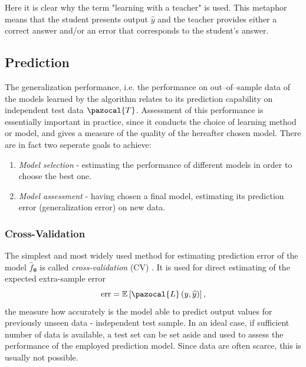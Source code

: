Here it is clear why the term "learning with a teacher" is used. This metaphor means that the student presents output $\widehat{y}$  and the teacher provides either a correct answer and/or an error that corresponds to the student's answer. 

\subsection{Prediction}
The generalization performance, i.e. the performance on out--of--sample data of the models learned by the algorithm relates to its prediction capability on independent test data $\pazocal{T}$. Assessment of this performance is essentially important in practice, since it conducts the choice of learning
method or model, and gives a measure of the quality of the hereafter
chosen model. There are in fact two seperate goals to achieve:
\begin{enumerate}
    \item \emph{Model selection} - estimating the performance of different models in order to choose the best one.
    \item \emph{Model assessment} - having chosen a final model, estimating its prediction error (generalization error) on new data.
\end{enumerate}
\subsubsection{Cross-Validation}
The simplest and most widely used method for estimating prediction error of the model $\hat{f}_{\boldsymbol{\theta}}$ is called \emph{cross-validation} (CV) \cite{statistics}. It is used for direct estimating of the expected extra-sample error
\begin{equation}
\mathrm{err} = \E\left[\pazocal{L}\left(y, \widehat{y}\right)\right],
\end{equation}
the measure how accurately is the model able to predict output values for previously unseen data - independent test sample. In an ideal case, if sufficient number of data is available, a test set can be set aside and used
to assess the performance of the employed prediction model. Since data are often
scarce, this is usually not possible.

